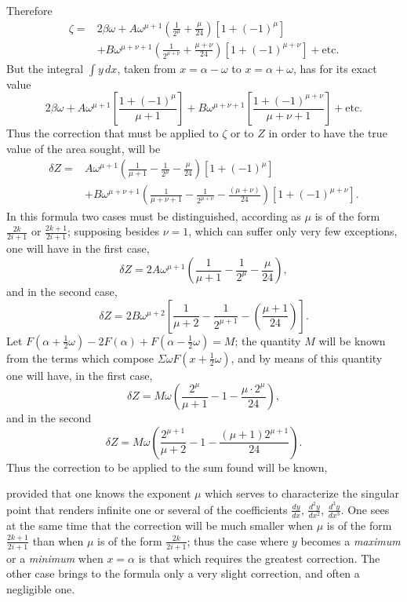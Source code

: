 \documentclass{article}
\begin{document}
Therefore
\[ \begin{aligned} \zeta={}&2\beta\omega+A\omega^{\mu+1}\left(\frac{1}{2^{\mu}}+\frac{\mu}{24}\right)[1+(-1)^{\mu}]\\ &+B\omega^{\mu+\nu+1}\left(\frac{1}{2^{\mu+\nu}}+\frac{\mu+\nu}{24}\right)[1+(-1)^{\mu+\nu}]+\text{etc.} \end{aligned} \]
But the integral $\displaystyle\int y\,dx$, taken from $x=\alpha-\omega$ to $x=\alpha+\omega$, has for its exact value
\[ 2\beta\omega+A\omega^{\mu+1}\left[\frac{1+(-1)^{\mu}}{\mu+1}\right]+B\omega^{\mu+\nu+1}\left[\frac{1+(-1)^{\mu+\nu}}{\mu+\nu+1}\right]+\text{etc.} \]
Thus the correction that must be applied to $\zeta$ or to $Z$ in order to have the true value of the area sought, will be
\[ \begin{aligned} \delta Z={}&A\omega^{\mu+1}\left(\frac{1}{\mu+1}-\frac{1}{2^{\mu}}-\frac{\mu}{24}\right)[1+(-1)^{\mu}]\\ &+B\omega^{\mu+\nu+1}\left(\frac{1}{\mu+\nu+1}-\frac{1}{2^{\mu+\nu}}-\frac{(\mu+\nu)}{24}\right)[1+(-1)^{\mu+\nu}]. \end{aligned} \]
In this formula two cases must be distinguished, according as $\mu$ is of the form $\frac{2k}{2i+1}$ or $\frac{2k+1}{2i+1}$; supposing besides $\nu=1$, which can suffer only very few exceptions, one will have in the first case,
\[ \delta Z=2A\omega^{\mu+1}\left(\frac{1}{\mu+1}-\frac{1}{2^{\mu}}-\frac{\mu}{24}\right), \]
and in the second case,
\[ \delta Z=2B\omega^{\mu+2}\left[\frac{1}{\mu+2}-\frac{1}{2^{\mu+1}}-\left(\frac{\mu+1}{24}\right)\right]. \]
Let $F(\alpha+\frac{1}{2}\omega)-2F(\alpha)+F(\alpha-\frac{1}{2}\omega)=M$; the quantity $M$ will be known from the terms which compose $\Sigma\omega F(x+\frac{1}{2}\omega)$, and by means of this quantity one will have, in the first case,
\[ \delta Z=M\omega\left(\frac{2^{\mu}}{\mu+1}-1-\frac{\mu\cdot2^{\mu}}{24}\right), \]
and in the second
\[ \delta Z=M\omega\left(\frac{2^{\mu+1}}{\mu+2}-1-\frac{(\mu+1)2^{\mu+1}}{24}\right). \]
Thus the correction to be applied to the sum found will be known,

provided that one knows the exponent $\mu$ which serves to characterize the singular point that renders infinite one or several of the coefficients $\frac{dy}{dx}$, $\frac{d^{2}y}{dx^{2}}$, $\frac{d^{3}y}{dx^{3}}$. One sees at the same time that the correction will be much smaller when $\mu$ is of the form $\frac{2k+1}{2i+1}$ than when $\mu$ is of the form $\frac{2k}{2i+1}$; thus the case where $y$ becomes a \emph{maximum} or a \emph{minimum} when $x=\alpha$ is that which requires the greatest correction. The other case brings to the formula only a very slight correction, and often a negligible one.
\end{document}

